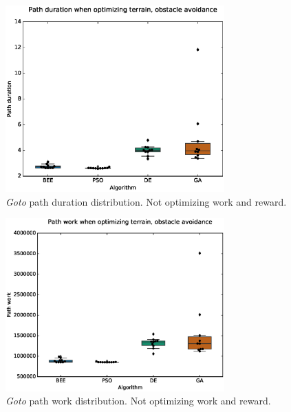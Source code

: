 \documentclass{tamuccthesis}
\begin{document}
\begin{figure}[H]
    \captionsetup{justification=centering}
    \centering
    \includegraphics[width=0.75\textwidth,trim={0cm 0.75cm 0cm 0.75cm},clip]{EXP3_histo_duration_a.eps}
    \caption{\textit{Goto} path duration distribution. Not optimizing work and reward. }
    \label{fig:algcompare_a_duration}
\end{figure}

\begin{figure}[H]
    \captionsetup{justification=centering}
    \centering
    \includegraphics[width=0.75\textwidth,trim={0cm 0.75cm 0cm 0.75cm},clip]{EXP3_histo_work_a.eps}
    \caption{\textit{Goto} path work distribution. Not optimizing work and reward. }
    \label{fig:algcompare_a_work}
\end{figure}
\end{document}
